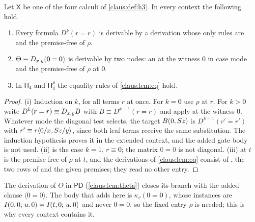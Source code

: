 \begin{lemma}
\label{claus:lem:hrefl}
Let $\mathsf{X}$ be one of the four calculi of \cref{claus:def:h3}. In every
context the following hold.
\begin{enumerate}[label=(\roman*)]
\item Every formula $D^k(r=r)$ is derivable by a derivation whose only
rules are  and the premise-free  of $\rho$.
\item $\Theta\equiv D_{x,y}(0=0)$ is derivable by two nodes: an
 at the witness $0$ in case mode and the premise-free
 of $\rho$ at $0$.
\item In $\mathsf{H}_4$ and $\mathsf{H}_4^{\rho}$ the equality rules of
\cref{claus:lem:eq} hold.
\end{enumerate}
\end{lemma}
\begin{proof}
(i) Induction on $k$, for all terms $r$ at once. For $k=0$ use $\rho$ at
$r$. For $k>0$ write $D^k(r=r)\equiv D_{x,y}B$ with
$B\equiv D^{k-1}(r=r)$ and apply  at the witness $0$.
Whatever mode the diagonal test selects, the target $B(0,S z)$ is
$D^{k-1}(r'=r')$ with $r'\equiv r\langle 0/x,S z/y\rangle$, since both
leaf terms receive the same substitution. The induction hypothesis proves
it in the extended context, and the added gate body is not used.
(ii) is the case $k=1$, $r\equiv 0$; the matrix $0=0$ is not diagonal.
(iii)  at $t$ is the premise-free  of $\rho$
at $t$, and the derivations of \cref{claus:lem:eq} consist of
, the two rows of  and the given premises;
they read no other entry.
\end{proof}

The derivation of $\Theta$ in $\mathsf{PD}$ (\cref{claus:lem:theta})
closes its branch with the added clause $\langle 0=0\rangle$. The body that
 adds here is $\kappa_v(0=0)$, whose instances are
$I(0,0;\,u.\,0)=I(t,0;\,u.\,0)$ and never $0=0$, so the fixed entry
$\rho$ is needed; this is why every context contains it.

